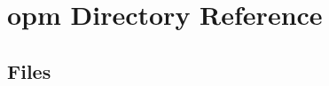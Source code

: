 \section{opm Directory Reference}
\label{dir_866feac67a4212daebc65c25b47e843f}
\subsection*{Files}
\begin{DoxyCompactItemize}
\end{DoxyCompactItemize}
